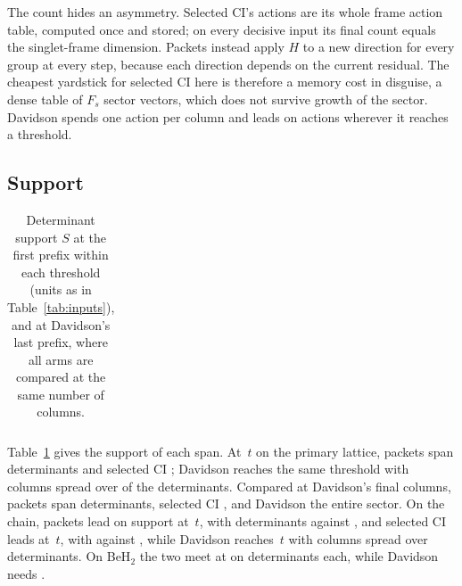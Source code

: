 \documentclass[aps,pra,reprint,superscriptaddress,nofootinbib,floatfix,
  showkeys,raggedbottom]{revtex4-2}
\newcommand{\tightcolumns}{\setlength{\tabcolsep}{3.2pt}}
\begin{document}
The count hides an asymmetry. Selected CI's \pkPrimarySciActions{} actions are
its whole frame action table, computed once and stored; on every decisive
input its final count equals the singlet-frame dimension. Packets instead
apply $H$ to a new direction for every group at every step, because each
direction depends on the current residual. The cheapest yardstick for selected
CI here is therefore a memory cost in disguise, a dense table of $F_s$ sector
vectors, which does not survive growth of the sector. Davidson spends one
action per column and leads on actions wherever it reaches a threshold.

\subsection{Support}
\label{sec:support}

\begin{table}[t]
\caption{Determinant support $S$ at the first prefix within each threshold
(units as in Table~\ref{tab:inputs}), and at Davidson's last prefix, where all
arms are compared at the same number of columns.}
\label{tab:support}
\begin{ruledtabular}
\tightcolumns
\begin{tabular}{lrrrrr}

\end{tabular}
\end{ruledtabular}
\end{table}

Table~\ref{tab:support} gives the support of each span. At \pkThresholdOne\,$t$ on the
primary lattice, packets span \pkPrimaryPacketsSupportOne{} determinants and
selected CI \pkPrimarySciSupportOne{}; Davidson reaches the same threshold with
\pkPrimaryDavidsonColumnsOne{} columns spread over
\pkPrimaryDavidsonSupportOne{} of the \pkPrimaryDeterminants{} determinants.
Compared at Davidson's final \pkPrimaryMatchedColumns{} columns, packets span
\pkPrimaryPacketsSupportMatched{} determinants, selected CI
\pkPrimarySciSupportMatched{}, and Davidson the entire sector. On the chain,
packets lead on support at \pkThresholdOne\,$t$, with \pkChainPacketsSupportOne{}
determinants against \pkChainSciSupportOne{}, and selected CI leads at
\pkThresholdTenth\,$t$, with \pkChainSciSupportTenth{} against
\pkChainPacketsSupportTenth{}, while Davidson reaches \pkThresholdTight\,$t$
with \pkChainDavidsonColumnsTight{} columns spread over
\pkChainDavidsonSupportTight{} determinants. On BeH$_2$ the two meet at \pkTightTarget{} on
\pkBerylliumPacketsSupportTight{} determinants each, while Davidson needs
\pkBerylliumDavidsonSupportTight{}.
\end{document}
